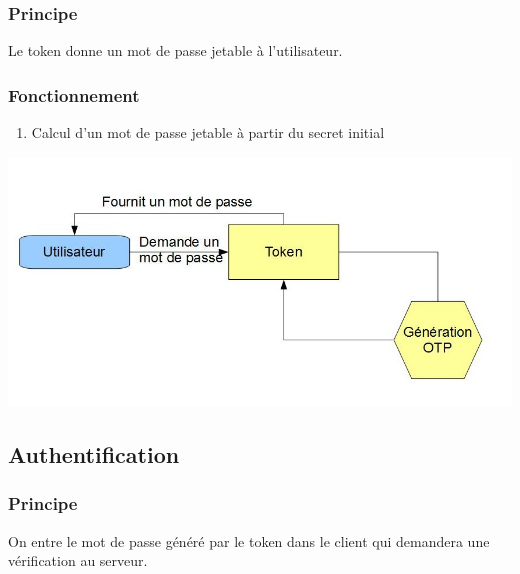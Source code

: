 \documentclass{"../../res/univ-projet"}
\begin{document}
\subsubsection{Principe}
Le token donne un mot de passe jetable à l'utilisateur.

\subsubsection{Fonctionnement}
\begin{enumerate}
    \item Calcul d'un mot de passe jetable à partir du secret 
        initial
\end{enumerate}
\includegraphics[width=\textwidth]{../generation.jpg}

\subsection{Authentification}
\subsubsection{Principe}
On entre le mot de passe généré par le token dans le client qui demandera une
vérification au serveur.
\end{document}
